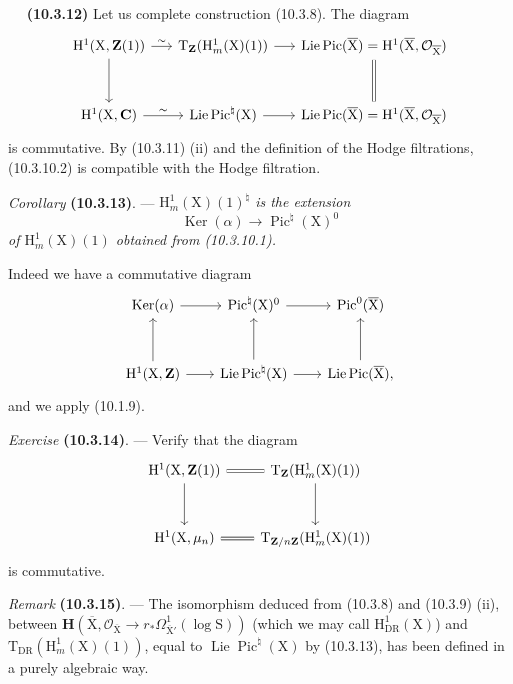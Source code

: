 \documentclass[11pt,leqno]{article}
\newcommand{\Page}[1]{\ifvmode\noindent\else\unskip\ \fi{\footnotesize\textcolor{gray}{[p.\,#1]}}\ \ignorespaces}
\begin{document}
\Page{74}
\textbf{(10.3.12)} Let us complete construction (10.3.8). The diagram
\[
\begin{tikzcd}[column sep=1.5em,row sep=3em]
\mathrm{H}^{1}(\mathrm{X},\mathbf{Z}(1))
 \arrow[r,"\sim"] \arrow[d]
&
\mathrm{T}_{\mathbf{Z}}(\mathrm{H}^{1}_{m}(\mathrm{X})(1))
 \arrow[r]
&
\operatorname{Lie}\operatorname{Pic}(\overline{\mathrm{X}})
 =\mathrm{H}^{1}(\overline{\mathrm{X}},\mathcal{O}_{\overline{\mathrm{X}}})
 \arrow[d,equal]
\\
\mathrm{H}^{1}(\mathrm{X},\mathbf{C})
 \arrow[r,"\sim"]
&
\operatorname{Lie}\operatorname{Pic}^{\natural}(\mathrm{X})
 \arrow[r]
&
\operatorname{Lie}\operatorname{Pic}(\overline{\mathrm{X}})
 =\mathrm{H}^{1}(\overline{\mathrm{X}},\mathcal{O}_{\overline{\mathrm{X}}})
\end{tikzcd}
\]
is commutative. By (10.3.11) (ii) and the definition of the Hodge filtrations, (10.3.10.2) is compatible with the Hodge filtration.

\textit{Corollary} \textbf{(10.3.13)}. — \textit{\(\mathrm{H}^{1}_{m}(\mathrm{X})(1)^{\natural}\) is the extension}
\[
\operatorname{Ker}(\alpha)\longrightarrow\operatorname{Pic}^{\natural}(\mathrm{X})^{0}
\]
\textit{of \(\mathrm{H}^{1}_{m}(\mathrm{X})(1)\) obtained from \textup{(10.3.10.1)}.}

Indeed we have a commutative diagram
\[
\begin{tikzcd}[column sep=2em,row sep=3em]
\operatorname{Ker}(\alpha) \arrow[r]
&
\operatorname{Pic}^{\natural}(\mathrm{X})^{0} \arrow[r]
&
\operatorname{Pic}^{0}(\overline{\mathrm{X}})
\\
\mathrm{H}^{1}(\mathrm{X},\mathbf{Z}) \arrow[r] \arrow[u]
&
\operatorname{Lie}\operatorname{Pic}^{\natural}(\mathrm{X})
 \arrow[r] \arrow[u]
&
\operatorname{Lie}\operatorname{Pic}(\overline{\mathrm{X}}), \arrow[u]
\end{tikzcd}
\]
and we apply (10.1.9).

\textit{Exercise} \textbf{(10.3.14)}. — Verify that the diagram
\[
\begin{tikzcd}[column sep=2em,row sep=3em]
\mathrm{H}^{1}(\mathrm{X},\mathbf{Z}(1))
 \arrow[r,equal] \arrow[d]
&
\mathrm{T}_{\mathbf{Z}}(\mathrm{H}^{1}_{m}(\mathrm{X})(1))
 \arrow[d]
\\
\mathrm{H}^{1}(\mathrm{X},\mu_n) \arrow[r,equal]
&
\mathrm{T}_{\mathbf{Z}/n\mathbf{Z}}(\mathrm{H}^{1}_{m}(\mathrm{X})(1))
\end{tikzcd}
\]
is commutative.

\textit{Remark} \textbf{(10.3.15)}. — The isomorphism deduced from (10.3.8) and (10.3.9) (ii), between \(\mathbf{H}(\overline{\mathrm{X}},\mathcal{O}_{\overline{\mathrm{X}}}\to r_*\Omega^{1}_{\overline{\mathrm{X}}'}(\log\mathrm{S}))\) (which we may call \(\mathrm{H}^{1}_{\mathrm{DR}}(\mathrm{X})\)) and \(\mathrm{T}_{\mathrm{DR}}(\mathrm{H}^{1}_{m}(\mathrm{X})(1))\), equal to \(\operatorname{Lie}\operatorname{Pic}^{\natural}(\mathrm{X})\) by (10.3.13), has been defined in a purely algebraic way.
\end{document}
